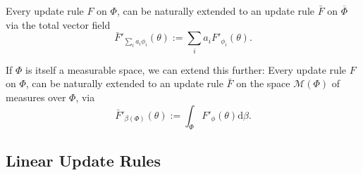 \documentclass{article}
\newcommand{\ext}[1]{\overline #1} %
\begin{document}
\begin{prop}
    Every  update rule $F$ on $\Phi$, can be naturally extended to an update rule
    $\bar F$ on $\ext\Phi$
    via the total vector field
    \[
        \bar F'_{\textstyle\sum_i a_i \phi_i} ( \theta ) := \sum_{i} a_i F'_{\phi_i}(\theta).
    \]
%
\end{prop}

If $\Phi$ is itself a measurable space, we can extend this further:
Every  update rule $F$ on $\Phi$, can be naturally extended to an update rule $\bar F$ on the space $\mathcal M(\Phi)$ of measures over $\Phi$, via
\[
    \bar F'_{\beta(\Phi)}( \theta ) := \int_{\Phi} F'_\phi(\theta) \mathrm d\beta.
\]



%
%

%
%
\subsection{Linear Update Rules}

\end{document}
